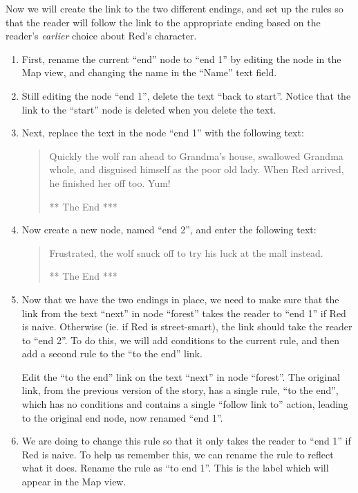 \documentclass{article}
\begin{document}
Now we will create the link to the two different endings, and set up the rules so that the reader will follow the link to the appropriate ending based on the reader's \textit{earlier} choice about Red's character.

\begin{enumerate}
  \item First, rename the current ``end'' node to ``end 1'' by editing the node in the Map view, and changing the name in the ``Name'' text field.
  \item Still editing the node ``end 1'', delete the text ``back to start''. Notice that the link to the ``start'' node is deleted when you delete the text.
  \item Next, replace the text in the node ``end 1'' with the following text:
  \begin{quotation}
  \noindent Quickly the wolf ran ahead to Grandma's house, swallowed Grandma whole, and disguised himself as the poor old lady. When Red arrived, he finished her off too. Yum!
  
  \bigskip
  
  \noindent *** The End ***
  \end{quotation}
  \item Now create a new node, named ``end 2'', and enter the following text:
  \begin{quotation}
  \noindent Frustrated, the wolf snuck off to try his luck at the mall instead.
  
  \bigskip
  
  \noindent *** The End ***
  \end{quotation}

\item Now that we have the two endings in place, we need to make sure that the link from the text ``next'' in node ``forest'' takes the reader to ``end 1'' if Red is naive. Otherwise (ie. if Red is street-smart), the link should take the reader to ``end 2''. To do this, we will add conditions to the current rule, and then add a second rule to the ``to the end'' link.

Edit the ``to the end'' link on the text ``next'' in node ``forest''.
The original link, from the previous version of the story, has a single rule, ``to the end'', which has no conditions and contains a single ``follow link to'' action, leading to the original end node, now renamed ``end 1''.

\item We are doing to change this rule so that it only takes the reader to ``end 1'' if Red is naive. To help us remember this, we can rename the rule to reflect what it does. Rename the rule as ``to end 1''. This is the label which will appear in the Map view.


\end{enumerate}
\end{document}
